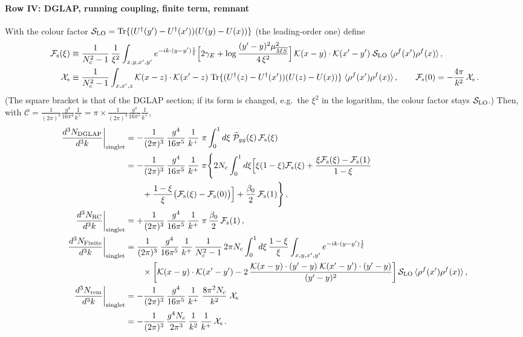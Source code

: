 \documentclass[10pt]{article}
\begin{document}
\paragraph*{Row IV: DGLAP, running coupling, finite term, remnant}
\noindent With the colour factor $\mathcal{S}_{\rm LO}={\rm Tr}\{(U^{\dagger}(y')-U^{\dagger}(x'))(U(y)-U(x))\}$ (the leading-order one) define
\begin{align}
\mathcal{F}_{\rm s}(\xi)&\equiv\frac{1}{N_{c}^{2}-1}\,\frac{1}{\xi^{2}}\int_{x,y,x',y'}e^{-ik\cdot(y-y')\frac{1}{\xi}}\Big[2\gamma_{E}+\log\frac{(y'-y)^{2}\mu^{2}_{\overline{MS}}}{4\,\xi^{2}}\Big]\,\mathcal{K}(x-y)\cdot\mathcal{K}(x'-y')\;\mathcal{S}_{\rm LO}\;\langle\rho^{f}(x')\rho^{f}(x)\rangle\,,\notag\\
\mathcal{X}_{\rm s}&\equiv\frac{1}{N_{c}^{2}-1}\int_{x,x',z}\mathcal{K}(x-z)\cdot\mathcal{K}(x'-z)\;{\rm Tr}\{(U^{\dagger}(z)-U^{\dagger}(x'))(U(z)-U(x))\}\;\langle\rho^{f}(x')\rho^{f}(x)\rangle\,,\qquad\mathcal{F}_{\rm s}(0)=-\frac{4\pi}{k^{2}}\,\mathcal{X}_{\rm s}\,.\notag
\end{align}
(The square bracket is that of the DGLAP section; if its form is changed, e.g.\ the $\xi^{2}$ in the logarithm, the colour factor stays $\mathcal{S}_{\rm LO}$.) Then, with $\mathcal{C}=\frac{1}{(2\pi)^{3}}\frac{g^{4}}{16\pi^{4}}\frac{1}{k^{+}}=\pi\times\frac{1}{(2\pi)^{3}}\frac{g^{4}}{16\pi^{5}}\frac{1}{k^{+}}$,
\begin{align}
\frac{d^{3}N_{\rm DGLAP}}{d^{3}k}\bigg|_{\rm singlet}&=-\frac{1}{(2\pi)^{3}}\,\frac{g^{4}}{16\pi^{5}}\,\frac{1}{k^{+}}\;\pi\int_{0}^{1}d\xi\;\widetilde{\mathcal P}_{gg}(\xi)\,\mathcal{F}_{\rm s}(\xi)\notag\\
&=-\frac{1}{(2\pi)^{3}}\,\frac{g^{4}}{16\pi^{5}}\,\frac{1}{k^{+}}\;\pi\Bigg\{2N_{c}\int_{0}^{1}d\xi\Big[\xi(1-\xi)\mathcal{F}_{\rm s}(\xi)+\frac{\xi\mathcal{F}_{\rm s}(\xi)-\mathcal{F}_{\rm s}(1)}{1-\xi}\notag\\&\qquad+\frac{1-\xi}{\xi}\big(\mathcal{F}_{\rm s}(\xi)-\mathcal{F}_{\rm s}(0)\big)\Big]+\frac{\beta_{0}}{2}\,\mathcal{F}_{\rm s}(1)\Bigg\}\,,\label{eq:s-DGLAP}\\
\frac{d^{3}N_{\rm RC}}{d^{3}k}\bigg|_{\rm singlet}&=+\frac{1}{(2\pi)^{3}}\,\frac{g^{4}}{16\pi^{5}}\,\frac{1}{k^{+}}\;\pi\,\frac{\beta_{0}}{2}\,\mathcal{F}_{\rm s}(1)\,,\label{eq:s-RC}\\
\frac{d^{3}N_{\rm Finite}}{d^{3}k}\bigg|_{\rm singlet}&=\frac{1}{(2\pi)^{3}}\,\frac{g^{4}}{16\pi^{5}}\,\frac{1}{k^{+}}\,\frac{1}{N_{c}^{2}-1}\,2\pi N_{c}\int_{0}^{1}d\xi\,\frac{1-\xi}{\xi}\int_{x,y,x',y'}e^{-ik\cdot(y-y')\frac{1}{\xi}}\notag\\&\qquad\times\bigg[\mathcal{K}(x-y)\cdot\mathcal{K}(x'-y')-2\,\frac{\mathcal{K}(x-y)\cdot(y'-y)\;\mathcal{K}(x'-y')\cdot(y'-y)}{(y'-y)^{2}}\bigg]\,\mathcal{S}_{\rm LO}\,\langle\rho^{f}(x')\rho^{f}(x)\rangle\,,\label{eq:s-fin}\\
\frac{d^{3}N_{\rm rem}}{d^{3}k}\bigg|_{\rm singlet}&=-\frac{1}{(2\pi)^{3}}\,\frac{g^{4}}{16\pi^{5}}\,\frac{1}{k^{+}}\;\frac{8\pi^{2}N_{c}}{k^{2}}\;\mathcal{X}_{\rm s}\notag\\&=-\frac{1}{(2\pi)^{3}}\,\frac{g^{4}N_{c}}{2\pi^{3}}\,\frac{1}{k^{2}}\,\frac{1}{k^{+}}\,\mathcal{X}_{\rm s}\,.\label{eq:s-rem}
\end{align}
\end{document}
